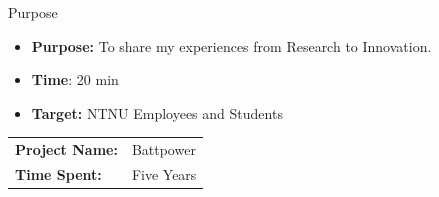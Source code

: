 \documentclass[12pt]{beamer}
\begin{document}
\begin{frame}
\titlepage
\end{frame}





\begin{frame}{Purpose}
\begin{itemize}
\item \textbf{Purpose:} To share my  experiences from Research to Innovation. 
\item \textbf{Time}: 20 min
\item \textbf{Target:} NTNU Employees and Students
\end{itemize}
\begin{center}
\begin{tabular}{|l l|} 
\hline
\rowcolor{Gray} \textbf{Project Name:} &Battpower \\
\textbf{Time Spent:}& Five Years\\
\hline
\end{tabular}
\end{center}
\end{frame}

\end{document}
